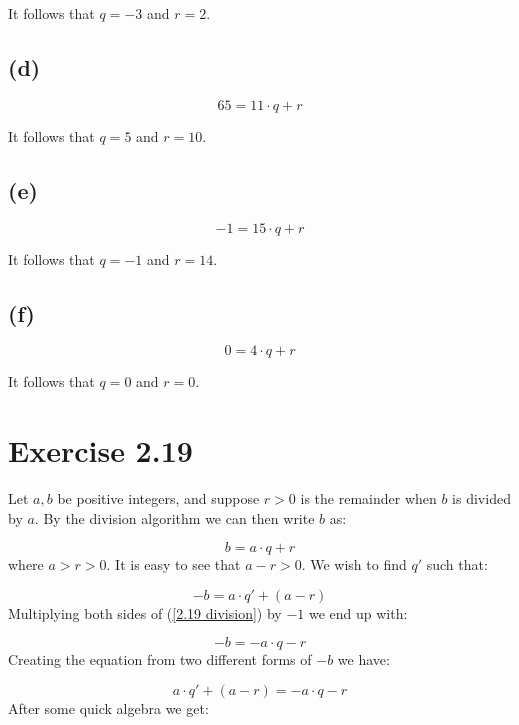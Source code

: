 \documentclass{article}
\begin{document}
It follows that $q=-3$ and $r=2$.
\subsection*{(d)}
\begin{equation*}
	65 = 11 \cdot q + r
\end{equation*}

It follows that $q=5$ and $r=10$.
\subsection*{(e)}
\begin{equation*}
	-1 = 15 \cdot q + r
\end{equation*}

It follows that $q=-1$ and $r=14$.
\subsection*{(f)}
\begin{equation*}
	0 = 4 \cdot q + r
\end{equation*}

It follows that $q=0$ and $r=0$.



\section*{Exercise 2.19}


Let $a, b$ be positive integers, and suppose $r > 0$ is the remainder when
\(b\) is divided by \(a\). By the division algorithm we can then write \(b\)
as:

\begin{equation} \label{2.19 division}
	b = a \cdot q + r
\end{equation}
where $a > r > 0$. It is easy to see that \(a - r > 0\). We wish to find \(q'\)
such that:

\begin{equation*}
	-b = a \cdot q' + (a-r)
\end{equation*}
Multiplying both sides of (\ref{2.19 division}) by \(-1\) we end up with:

\begin{equation*}
	-b = -a \cdot q - r
\end{equation*}
Creating the equation from two different forms of \(-b\) we have:

\begin{equation*}	
	a \cdot q' + (a-r) = -a \cdot q - r
\end{equation*}
After some quick algebra we get:
\end{document}

